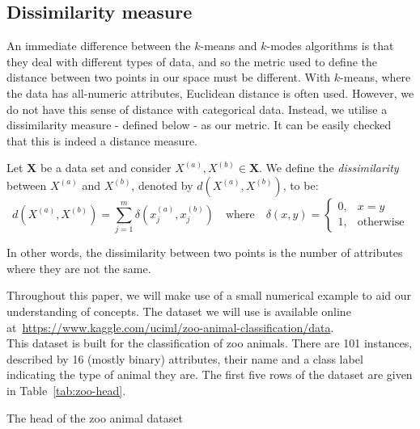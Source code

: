 \subsection{Dissimilarity measure}\label{subsection:dissim}

An immediate difference between the \(k\)-means and \(k\)-modes algorithms is 
that they deal with different types of data, and so the metric used to define 
the distance between two points in our space must be different. With 
\(k\)-means, where the data has all-numeric attributes, Euclidean distance is 
often used. However, we do not have this sense of distance with categorical 
data. Instead, we utilise a dissimilarity measure - defined below - as our 
metric. It can be easily checked that this is indeed a distance measure.\\

\begin{definition}\label{def:dissim}
	Let $\textbf{X}$ be a data set and consider $X^{(a)}, X^{(b)} \in 
    \textbf{X}$. We define the \emph{dissimilarity} between $X^{(a)}$ and 
    $X^{(b)}$, denoted by \(d(X^{(a)}, X^{(b)})\), to be:
	\[
	d(X^{(a)}, X^{(b)}) = \sum_{j=1}^{m} \delta(x_j^{(a)}, x_j^{(b)}) \quad
	\text{where} \quad \delta(x, y) = \begin{cases}
                                        0, & x = y \\
					                    1, & \text{otherwise}
					                  \end{cases}
	\]

    In other words, the dissimilarity between two points is the number of
    attributes where they are not the same.
\end{definition}


\begin{example}
    Throughout this paper, we will make use of a small numerical example to aid 
    our understanding of concepts. The dataset we will use is available online 
    at~\url{https://www.kaggle.com/uciml/zoo-animal-classification/data}.\\

    This dataset is built for the classification of zoo animals. There are 101
    instances, described by 16 (mostly binary) attributes, their name and a 
    class label indicating the type of animal they are. The first five rows of 
    the dataset are given in Table~\ref{tab:zoo-head}.\\
    
    \begin{table}[h]
    \resizebox{\textwidth}{!}{%
        \centering
        
    }
    \caption{The head of the zoo animal dataset}
    \label{tab:zoo-head}
    \end{table}
\end{example}

